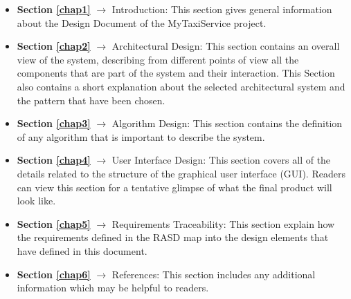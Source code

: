 \begin{itemize}
	\item \textbf{Section \ref{chap1}} $\rightarrow$ Introduction: This section gives general information about the Design Document of the MyTaxiService project.
	\item \textbf{Section \ref{chap2}} $\rightarrow$ Architectural Design: This section contains an overall view of the system, describing from different points of view all the components that are part of the system and their interaction. This Section also contains a short explanation about the selected architectural system and the pattern that have been chosen.
	\item \textbf{Section \ref{chap3}} $\rightarrow$ Algorithm Design: This section contains the definition of any algorithm that is important to describe the system.
	\item \textbf{Section \ref{chap4}} $\rightarrow$ User Interface Design: This section covers all of the details related to the structure of the graphical user interface (GUI). Readers can view this section for a tentative glimpse of what the final product will look like.
	\item \textbf{Section \ref{chap5}} $\rightarrow$ Requirements Traceability: This section explain how the requirements defined in the RASD map into the design elements that have defined in this document.
	\item \textbf{Section \ref{chap6}} $\rightarrow$ References: This section includes any additional information which may be helpful to readers.
\end{itemize}